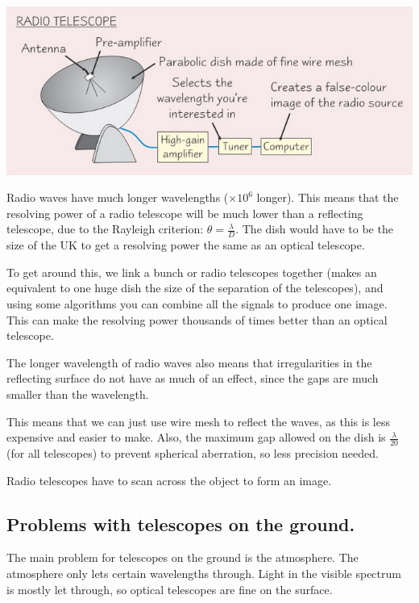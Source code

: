 \documentclass[a4paper, 12pt]{article}
\begin{document}
\begin{center}
\includegraphics[width=\textwidth]{images/radioTelescope.png}
\end{center}

Radio waves have much longer wavelengths ($\times 10^6$ longer). This means that the resolving power of a radio telescope will be much lower than a reflecting telescope, due to the Rayleigh criterion: $\theta = \frac{\lambda}{D}$. The dish would have to be the size of the UK to get a resolving power the same as an optical telescope.

To get around this, we link a bunch or radio telescopes together (makes an equivalent to one huge dish the size of the separation of the telescopes), and using some algorithms you can combine all the signals to produce one image. This can make the resolving power thousands of times better than an optical telescope.

The longer wavelength of radio waves also means that irregularities in the reflecting surface do not have as much of an effect, since the gaps are much smaller than the wavelength.

This means that we can just use wire mesh to reflect the waves, as this is less expensive and easier to make. Also, the maximum gap allowed on the dish is $\frac{\lambda}{20}$ (for all telescopes) to prevent spherical aberration, so less precision needed.

Radio telescopes have to scan across the object to form an image.

\subsection{Problems with telescopes on the ground.}

The main problem for telescopes on the ground is the atmosphere. The atmosphere only lets certain wavelengths through. Light in the visible spectrum is mostly let through, so optical telescopes are fine on the surface.
\end{document}
